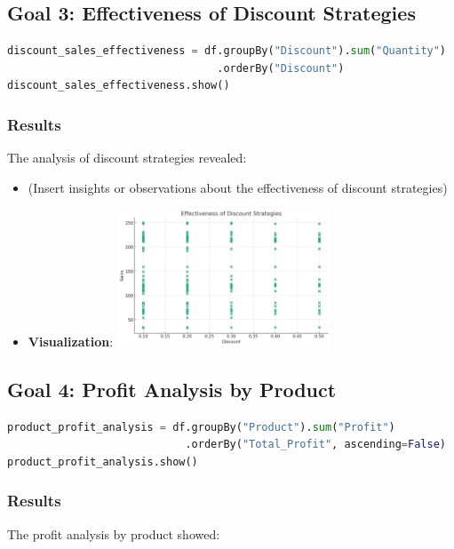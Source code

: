 \documentclass{article}
\begin{document}

\subsection{Goal 3: Effectiveness of Discount Strategies}
\begin{lstlisting}[language=Python, caption={Analyzing the effectiveness of discount strategies}]
discount_sales_effectiveness = df.groupBy("Discount").sum("Quantity")
                                 .orderBy("Discount")
discount_sales_effectiveness.show()
\end{lstlisting}
\subsubsection{Results}
The analysis of discount strategies revealed:

\begin{itemize}
    \item (Insert insights or observations about the effectiveness of discount strategies)
    \item \textbf{Visualization}: \includegraphics[width=0.5\textwidth]{goal3.jpeg}
\end{itemize}

\subsection{Goal 4: Profit Analysis by Product}
\begin{lstlisting}[language=Python, caption={Profit analysis per product}]
product_profit_analysis = df.groupBy("Product").sum("Profit")
                            .orderBy("Total_Profit", ascending=False)
product_profit_analysis.show()
\end{lstlisting}
\subsubsection{Results}
The profit analysis by product showed:
\end{document}
